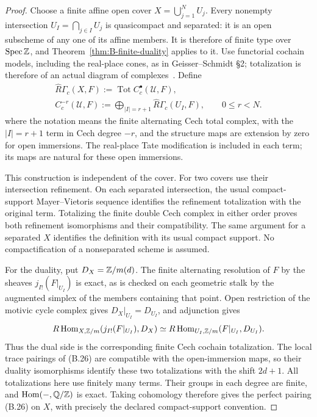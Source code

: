 \begin{proof}
Choose a finite affine open cover \(X=\bigcup_{j=1}^N U_j\).
Every nonempty intersection \(U_I=\bigcap_{j\in I}U_j\) is
quasicompact and separated: it is an open subscheme of any one
of its affine members.  It is therefore of finite type over
\(\operatorname{Spec}\mathbb Z\), and Theorem~\ref{thm:B-finite-duality} applies
to it.  Use functorial cochain models, including the real-place
cones, as in Geisser--Schmidt \S2; totalization is therefore of
an actual diagram of complexes~\cite{BGeisserSchmidt2018}.  Define
\[
 \begin{gathered}
 \widehat R\Gamma_c(X,F):=\operatorname{Tot} C_c^\bullet(\mathcal U,F),\\
 C_c^{-r}(\mathcal U,F):=
 \bigoplus_{|I|=r+1}\widehat R\Gamma_c(U_I,F),\qquad 0\le r<N.
 \end{gathered}
\]
where the notation means the finite alternating Cech total complex,
with the \(|I|=r+1\) term in Cech degree \(-r\), and the
structure maps are extension by zero for open immersions.
The real-place Tate modification is included in
each term; its maps are natural for these open immersions.

This construction is independent of the cover.  For two covers
use their intersection refinement.  On each separated intersection,
the usual compact-support Mayer--Vietoris sequence identifies the
refinement totalization with the original term.  Totalizing the
finite double Cech complex in either order proves both refinement
isomorphisms and their compatibility.  The same argument for a
separated \(X\) identifies the definition with its usual compact
support.  No compactification of a nonseparated scheme is assumed.

For the duality, put \(D_X=\mathbb Z/m(d)\).  The finite alternating
resolution of \(F\) by the sheaves \(j_{I!}(F|_{U_I})\)
is exact, as is checked on each geometric stalk by the augmented
simplex of the members containing that point.  Open restriction
of the motivic cycle complex gives \(D_X|_{U_I}=D_{U_I}\),
and adjunction gives
\[
 R\operatorname{Hom}_{X,\mathbb Z/m}
 (j_{I!}(F|_{U_I}),D_X)
 \simeq R\operatorname{Hom}_{U_I,\mathbb Z/m}(F|_{U_I},D_{U_I}).
\]
Thus the dual side is the corresponding finite Cech cochain
totalization.  The local trace pairings of (B.26) are compatible
with the open-immersion maps, so their duality isomorphisms
identify these two totalizations with the shift \(2d+1\).
All totalizations here use finitely many terms.  Their groups in
each degree are finite, and \(\operatorname{Hom}(-,\mathbb Q/\mathbb Z)\)
is exact.  Taking cohomology therefore gives the perfect pairing
(B.26) on \(X\), with precisely the declared compact-support
convention.
\end{proof}

